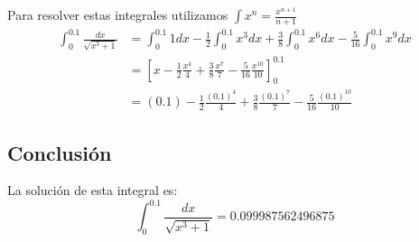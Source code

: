         Para resolver estas integrales utilizamos $ \int x^n = \frac{x^{n+1}}{n+1} $
        \begin{align}
            \int_0^{0.1} \frac{dx}{\sqrt{x^3 + 1}} & = \int_0^{0.1} 1 dx -  \frac{1}{2} \int_0^{0.1} x^3 dx + \frac{3}{8} \int_0^{0.1} x^6 dx 
            - \frac{5}{16} \int_0^{0.1} x^9 dx \\
            & = \left[x -  \frac{1}{2} \frac{x^4}{4} + \frac{3}{8} \frac{x^7}{7} -  \frac{5}{16}  \frac{x^{10}}{10} \right]_0^{0.1} \\
            & = (0.1) -  \frac{1}{2} \frac{(0.1)^4}{4} + \frac{3}{8} \frac{(0.1)^7}{7} -  \frac{5}{16}  \frac{(0.1)^{10}}{10}
        \label{eq:sol6p}
        \end{align}

\subsection*{Conclusión}
    La solución de esta integral es:
    \begin{equation*}
        \boxed{\int_0^{0.1} \frac{dx}{\sqrt{x^3 + 1}} = 0.099987562496875}
    \end{equation*}